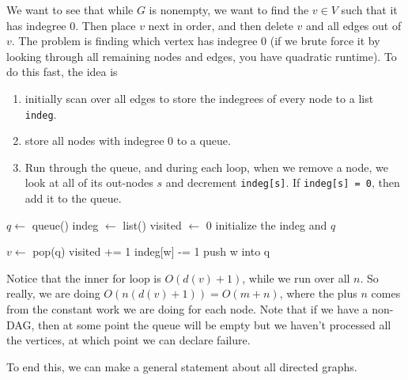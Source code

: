   \begin{algo}
    We want to see that while $G$ is nonempty, we want to find the $v \in V$ such that it has indegree $0$. Then place $v$ next in order, and then delete $v$ and all edges out of $v$. The problem is finding which vertex has indegree $0$ (if we brute force it by looking through all remaining nodes and edges, you have quadratic runtime). To do this fast, the idea is 
    \begin{enumerate}
      \item initially scan over all edges to store the indegrees of every node to a list \texttt{indeg}. 
      \item store all nodes with indegree $0$ to a queue. 
      \item Run through the queue, and during each loop, when we remove a node, we look at all of its out-nodes $s$ and decrement \texttt{indeg[s]}. If \texttt{indeg[s] = 0}, then add it to the queue. 
    \end{enumerate}
    \begin{algorithm}[H]
      \label{alg:recursive_top_sort}
      \begin{algorithmic}[1]
        \State $q \gets$ queue() 
        \State indeg $\gets$ list() 
        \State visited $\gets$ 0
          \State initialize the indeg and $q$ 

            \State $v \gets$ pop(q) 
            \State visited += 1 
              \State indeg[w] -= 1 
                \State push w into q 
              \EndIf
            \EndFor
          \EndWhile

            \State {}
          \EndIf

          \State {}
        \EndFunction
      \end{algorithmic}
    \end{algorithm}
    Notice that the inner for loop is $O(d(v) + 1)$, while we run over all $n$. So really, we are doing $O(n(d(v) + 1)) = O(m + n)$, where the plus $n$ comes from the constant work we are doing for each node. Note that if we have a non-DAG, then at some point the queue will be empty but we haven't processed all the vertices, at which point we can declare failure. 
  \end{algo}

  To end this, we can make a general statement about all directed graphs. 

